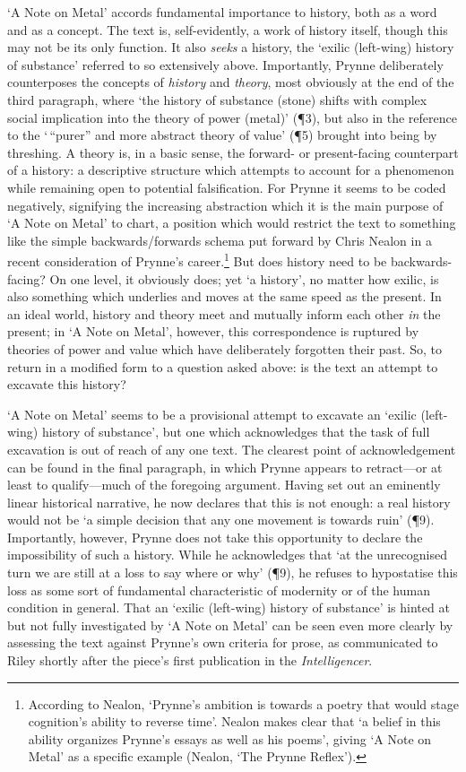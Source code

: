 \documentclass[]{article}
\begin{document}
`A Note on Metal' accords fundamental importance to history, both as a
word and as a concept. The text is, self-evidently, a work of history
itself, though this may not be its only function. It also \emph{seeks} a
history, the `exilic (left-wing) history of substance' referred to so
extensively above. Importantly, Prynne deliberately counterposes the
concepts of \emph{history} and \emph{theory}, most obviously at the end
of the third paragraph, where `the history of substance (stone) shifts
with complex social implication into the theory of power (metal)' (¶3),
but also in the reference to the `\,``purer'' and more abstract theory
of value' (¶5) brought into being by threshing. A theory is, in a basic
sense, the forward- or present-facing counterpart of a history: a
descriptive structure which attempts to account for a phenomenon while
remaining open to potential falsification. For Prynne it seems to be
coded negatively, signifying the increasing abstraction which it is the
main purpose of `A Note on Metal' to chart, a position which would
restrict the text to something like the simple backwards/forwards schema
put forward by Chris Nealon in a recent consideration of Prynne's
career.\footnote{According to Nealon, `Prynne's ambition is towards a
  poetry that would stage cognition's ability to reverse time'. Nealon
  makes clear that `a belief in this ability organizes Prynne's essays
  as well as his poems', giving `A Note on Metal' as a specific example
  (Nealon, `The Prynne Reflex').} But does history need to be
backwards-facing? On one level, it obviously does; yet `a history', no
matter how exilic, is also something which underlies and moves at the
same speed as the present. In an ideal world, history and theory meet
and mutually inform each other \emph{in} the present; in `A Note on
Metal', however, this correspondence is ruptured by theories of power
and value which have deliberately forgotten their past. So, to return in
a modified form to a question asked above: is the text an attempt to
excavate this history?

`A Note on Metal' seems to be a provisional attempt to excavate an
`exilic (left-wing) history of substance', but one which acknowledges
that the task of full excavation is out of reach of any one text. The
clearest point of acknowledgement can be found in the final paragraph,
in which Prynne appears to retract---or at least to qualify---much of
the foregoing argument. Having set out an eminently linear historical
narrative, he now declares that this is not enough: a real history would
not be `a simple decision that any one movement is towards ruin' (¶9).
Importantly, however, Prynne does not take this opportunity to declare
the impossibility of such a history. While he acknowledges that `at the
unrecognised turn we are still at a loss to say where or why' (¶9), he
refuses to hypostatise this loss as some sort of fundamental
characteristic of modernity or of the human condition in general. That
an `exilic (left-wing) history of substance' is hinted at but not fully
investigated by `A Note on Metal' can be seen even more clearly by
assessing the text against Prynne's own criteria for prose, as
communicated to Riley shortly after the piece's first publication in the
\emph{Intelligencer}.
\end{document}
